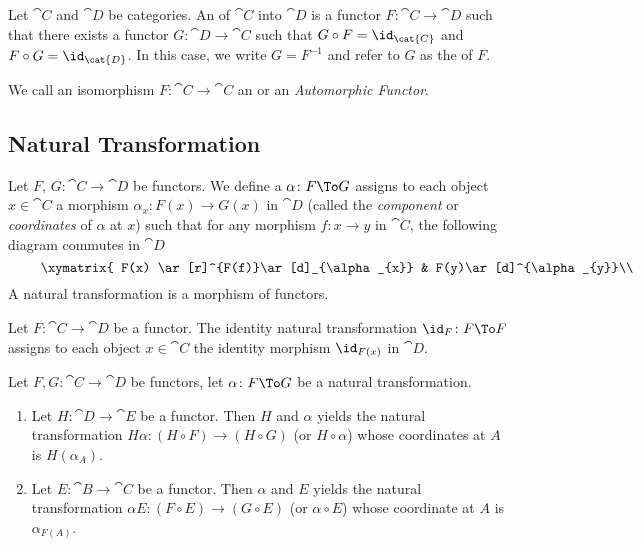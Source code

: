 \begin{definition}
Let $\cat{C}$ and $\cat{D}$ be categories.
An  of $\cat{C}$ into $\cat{D}$ is a functor
$F\colon\cat{C}\to\cat{D}$ such that there exists a functor
$G\colon\cat{D}\to\cat{C}$ such that $G\circ F=\id_{\cat{C}}$ and
$F\circ G=\id_{\cat{D}}$. In this case, we write $G=F^{-1}$ and refer
to $G$ as the  of $F$.

We call an isomorphism $F\colon\cat{C}\to\cat{C}$ an
 or an \emph{Automorphic Functor}.
\end{definition}

\subsection{Natural Transformation}

\begin{definition}
Let $F$, $G\colon\cat{C}\to\cat{D}$ be functors.
We define a  $\alpha\colon F\To G$
assigns to each object $x\in\cat{C}$ a morphism $\alpha_{x}\colon F(x)\to G(x)$
in $\cat{D}$ (called the \emph{component} or \emph{coordinates} of $\alpha$ at $x$) such
that for any morphism $f\colon x\to y$ in $\cat{C}$, the following
diagram commutes in $\cat{D}$
\begin{equation}
\vcenter{\xymatrix{
F(x) \ar[r]^{F(f)}\ar[d]_{\alpha_{x}} & F(y)\ar[d]^{\alpha_{y}}\\ 
G(x) \ar[r]_{G(f)} & G(y)
}}
\end{equation}
A natural transformation is a morphism of functors.
\end{definition}

\begin{example}
Let $F\colon\cat{C}\to\cat{D}$ be a functor. The identity natural
transformation $\id_{F}\colon F\To F$ assigns to each object
$x\in\cat{C}$ the identity morphism $\id_{F(x)}$ in $\cat{D}$.
\end{example}

\begin{definition}[Whiskering]
Let $F,G\colon\cat{C}\to\cat{D}$ be functors, let $\alpha\colon F\To G$
be a natural transformation.
\begin{enumerate}
\item{} Let $H\colon\cat{D}\to\cat{E}$ be a functor. Then
 $H$ and $\alpha$ yields the natural transformation
$H\alpha\colon(H\circ F)\to(H\circ G)$ (or $H\circ\alpha$) whose
coordinates at $A$ is $H(\alpha_{A})$.
\item{} Let $E\colon\cat{B}\to\cat{C}$ be a functor. Then
 $\alpha$ and $E$ yields the natural transformation
$\alpha E\colon(F\circ E)\to(G\circ E)$ (or $\alpha\circ E$) whose
coordinate at $A$ is $\alpha_{F(A)}$. 
\end{enumerate}
\end{definition}

